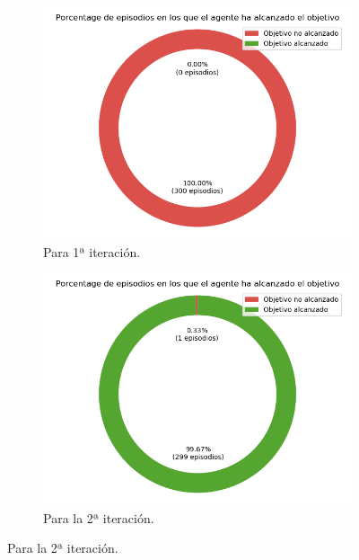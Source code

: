 \begin{figure}
    \centering
    \begin{subfigure}{.5\textwidth}
        \centering
        \includegraphics[scale=0.3]{cap5_experimentacion/images/CHANGE_GOAL-20_09-21_35-1, 0, 2_it1_porcentajeResuelto.png}
        \caption{Para 1ª iteración.}
        \label{fig:CHANGE_GOAL-20_09-21_35-1, 0, 2_it1_porcentajeResuelto}
    \end{subfigure}%
    \begin{subfigure}{.5\textwidth}
        \centering
        \includegraphics[scale=0.3]{cap5_experimentacion/images/CHANGE_GOAL-20_09-21_35-1, 0, 2_it2_porcentajeResuelto.png}
        \caption{Para la 2ª iteración.}
        \label{fig:CHANGE_GOAL-20_09-21_35-1, 0, 2_it2_porcentajeResuelto}

\end{subfigure}
\end{figure}
